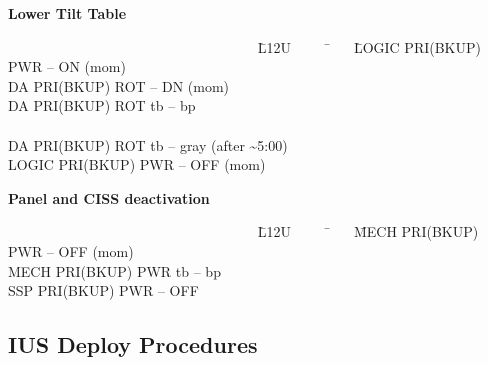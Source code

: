\documentclass[Space_Shuttle_Ultra_Manual.tex]{subfiles}
\begin{document}
{\noindent
\hspace{100pt}\textbf{Lower Tilt Table}
\begin{tabbing}
~~~~~~~~~~~~~~~~~~~~~~~~~~~~~~~~~~~ \= L12U~~~~~ \= ~~ \= LOGIC PRI(BKUP) PWR -- ON (mom)\\
\>\>\> DA PRI(BKUP) ROT -- DN (mom)\\
\>\>\> DA PRI(BKUP) ROT tb -- bp\\\\
\>\>\> DA PRI(BKUP) ROT tb -- gray (after \textasciitilde5:00)\\
\>\>\> LOGIC PRI(BKUP) PWR -- OFF (mom)\\
\end{tabbing}

\noindent
\hspace{100pt}\textbf{Panel and CISS deactivation}
\begin{tabbing}
~~~~~~~~~~~~~~~~~~~~~~~~~~~~~~~~~~~ \= L12U~~~~~ \= ~~ \= MECH PRI(BKUP) PWR -- OFF (mom)\\
\>\>\> MECH PRI(BKUP) PWR tb -- bp\\
\>\>\> SSP PRI(BKUP) PWR -- OFF\\
\end{tabbing}
}

\newpage
\subsection{IUS Deploy Procedures}
\end{document}
